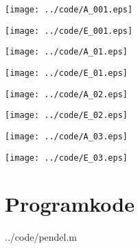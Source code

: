 \texttt{[image: ../code/A\_001.eps]}

\vfill

\texttt{[image: ../code/E\_001.eps]}


\texttt{[image: ../code/A\_01.eps]}

\vfill

\texttt{[image: ../code/E\_01.eps]}


\texttt{[image: ../code/A\_02.eps]}

\vfill

\texttt{[image: ../code/E\_02.eps]}


\texttt{[image: ../code/A\_03.eps]}

\vfill

\texttt{[image: ../code/E\_03.eps]}


\clearpage
\section{Programkode} %
\label{sec:programkode}

  {../code/pendel.m}


